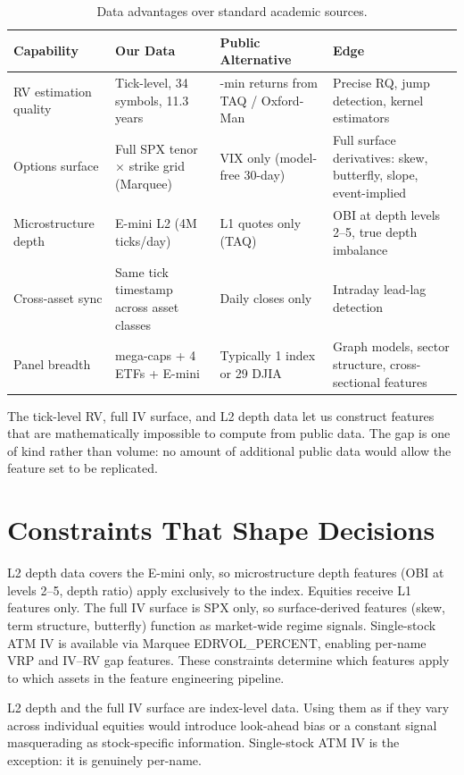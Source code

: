 \begin{table}[htbp]
\centering
\caption{Data advantages over standard academic sources.}
\label{tab:gs-edge}
\small
\begin{tabular}{%
  >{\raggedright\arraybackslash}p{2.2cm}
  >{\raggedright\arraybackslash}p{3.0cm}
  >{\raggedright\arraybackslash}p{3.0cm}
  >{\raggedright\arraybackslash}p{3.8cm}}
\toprule
\textbf{Capability} & \textbf{Our Data} & \textbf{Public Alternative} & \textbf{Edge} \\
\midrule
RV estimation quality &
  Tick-level, 34 symbols, 11.3 years &
  5-min returns from TAQ / Oxford-Man &
  Precise RQ, jump detection, kernel estimators \\[6pt]
Options surface &
  Full SPX tenor $\times$ strike grid (Marquee) &
  VIX only (model-free 30-day) &
  Full surface derivatives: skew, butterfly, slope, event-implied \\[6pt]
Microstructure depth &
  E-mini L2 (4M ticks/day) &
  L1 quotes only (TAQ) &
  OBI at depth levels 2--5, true depth imbalance \\[6pt]
Cross-asset sync &
  Same tick timestamp across asset classes &
  Daily closes only &
  Intraday lead-lag detection \\[6pt]
Panel breadth &
  30 mega-caps + 4 ETFs + E-mini &
  Typically 1 index or 29 DJIA &
  Graph models, sector structure, cross-sectional features \\
\bottomrule
\end{tabular}
\end{table}

\begin{keyidea}
The tick-level RV, full IV surface, and L2 depth data let us construct features that are mathematically impossible to compute from public data. The gap is one of kind rather than volume: no amount of additional public data would allow the feature set to be replicated.
\end{keyidea}


\section{Constraints That Shape Decisions}
\label{sec:data-constraints}

L2 depth data covers the E-mini only, so microstructure depth features (OBI at levels 2--5, depth ratio) apply exclusively to the index.
Equities receive L1 features only.
The full IV surface is SPX only, so surface-derived features (skew, term structure, butterfly) function as market-wide regime signals.
Single-stock ATM IV is available via Marquee EDRVOL\_PERCENT, enabling per-name VRP and IV--RV gap features.
These constraints determine which features apply to which assets in the feature engineering pipeline.

\begin{warning}
L2 depth and the full IV surface are index-level data. Using them as if they vary across individual equities would introduce look-ahead bias or a constant signal masquerading as stock-specific information.
Single-stock ATM IV is the exception: it is genuinely per-name.
\end{warning}
